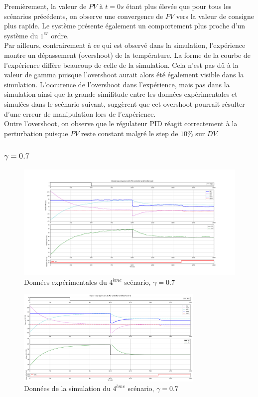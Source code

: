 Premièrement, la valeur de $PV$ à $t = 0s$ étant plus élevée que pour tous les scénarios précédents, on observe une convergence de $PV$ vers la valeur de consigne 
plus rapide. Le système présente également un comportement plus proche d'un système du $1^{er}$ ordre. 
\\Par ailleurs, contrairement à ce qui est observé dans la simulation, l'expérience montre un dépassement (overshoot) de la température.
La forme de la courbe de l'expérience diffère beaucoup de celle de la simulation. Cela n'est pas dû à la valeur de gamma puisque l'overshoot aurait alors été également visible dans la simulation. 
L'occurence de l'overshoot dans l'expérience, mais pas dans la simulation ainsi que la grande similitude entre les données expérimentales et simulées dans le 
scénario suivant, suggèrent que cet overshoot pourrait résulter d'une erreur de manipulation lors de l'expérience.
\\Outre l'overshoot, on observe que le régulateur PID réagit correctement à la perturbation puisque $PV$ reste constant malgré le step de $10\%$ sur $DV$.

\subsubsection{$\gamma = 0.7$}

\begin{figure}[H]
	\centering
	\includegraphics[width=1\textwidth]{../Plots/Experiment_scenario_7_2024-03-29-22h23.png}
	\caption{Données expérimentales du $4^{ème}$ scénario, $\gamma = 0.7$}
	\label{fig:exp_scenario5_0.7}
\end{figure}
\begin{figure}[H]
	\centering
	\includegraphics[width=0.8\textwidth]{figures/scenario77.png}
	\caption{Données de la simulation du $4^{ème}$ scénario, $\gamma = 0.7$}
	\label{fig:sim_scenario5_0.7}
\end{figure}

